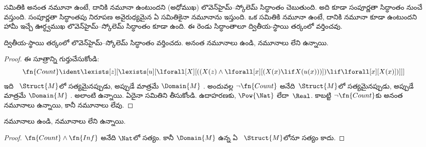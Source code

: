 \documentclass[../../../include/open-logic-section]{subfiles}
\begin{document}


\begin{explain}
 సమితికి అనంత నమూనా ఉంటే, దానికి
 నమూనా ఉంటుందని (అధోముఖ)
లొవెన్‌హైమ్--స్కోలెమ్ సిద్ధాంతం చెబుతుంది. అది కూడా సంపూర్ణతా సిద్ధాంతం
నుంచే వస్తుంది. సంపూర్ణతా సిద్ధాంతపు నిరూపణ అవైరుధ్యమైన ఏ 
సమితికైనా  నమూనాను ఇస్తుంది. ఒక  సమితికి
 నమూనా ఉంటే, దానికి
 నమూనా కూడా ఉంటుందని హామీ ఇచ్చే
ఊర్ధ్వముఖ లొవెన్‌హైమ్--స్కోలెమ్ సిద్ధాంతం కూడా ఉంది. ఈ రెండు సిద్ధాంతాలూ
ద్వితీయ-స్థాయి తర్కంలో వర్తించవు.
\end{explain}


\begin{thm}
 ద్వితీయ-స్థాయి తర్కంలో లొవెన్‌హైమ్--స్కోలెమ్
సిద్ధాంతం వర్తించదు. అనంత నమూనాలు ఉండి,
 నమూనాలు లేని  ఉన్నాయి.
\end{thm}

\begin{proof}
ఈ సూత్రాన్ని గుర్తుచేసుకోండి:
\[
\fn{Count} \ident \lexists[z][\lexists[u][\lforall[X][((X(z) \land
      \lforall[x][(X(x) \lif X(u(x)))]) \lif \lforall[x][X(x)])]]]
\]
ఇది ~$\Struct{M}$లో సత్యమైనప్పుడు, అప్పుడే మాత్రమే
$\Domain{M}$ . అందువల్ల
$\lnot\fn{Count}$ అనేది~$\Struct{M}$లో సత్యమైనప్పుడు, అప్పుడే మాత్రమే $\Domain{M}$
. అలాంటి
 ఉన్నాయి. 
ఏదైనా  సమితిని తీసుకోండి. ఉదాహరణకు,
$\Pow{\Nat}$ లేదా~$\Real$. కాబట్టి $\lnot \fn{Count}$కు అనంత నమూనాలు
ఉన్నాయి, కానీ  నమూనాలు లేవు.
\end{proof}

\begin{thm}
 నమూనాలు ఉండి,
 నమూనాలు లేని  ఉన్నాయి.
\end{thm}

\begin{proof}
$\fn{Count} \land \fn{Inf}$ అనేది $\Nat$లో సత్యం. కానీ $\Domain{M}$
 ఉన్న ఏ
~$\Struct{M}$లోనూ సత్యం కాదు.
\end{proof}
\end{document}
